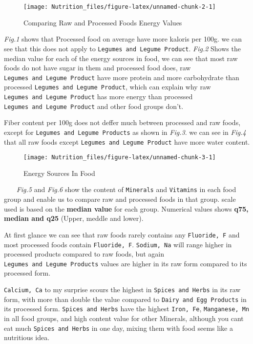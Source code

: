 \documentclass[]{article}
\begin{document}
\begin{figure}

{\centering \texttt{[image: Nutrition\_files/figure-latex/unnamed-chunk-2-1]} 

}

\caption{Comparing Raw and Processed Foods Energy Values}\label{fig:unnamed-chunk-2}
\end{figure}

\emph{Fig.1} shows that Processed food on average have more kaloris per
100g. we can see that this does not apply to
\texttt{Legumes\ and\ Legume\ Product}. \emph{Fig.2} Shows the median
value for each of the energy sources in food, we can see that most raw
foods do not have sugar in them and processed food does, raw
\texttt{Legumes\ and\ Legume\ Product} have more protein and more
carbohydrate than processed \texttt{Legumes\ and\ Legume\ Product},
which can explain why raw \texttt{Legumes\ and\ Legume\ Product} has
more energy than processed \texttt{Legumes\ and\ Legume\ Product} and
other food groups don't.

Fiber content per 100g does not deffer much between processed and raw
foods, except for \texttt{Legumes\ and\ Legume\ Products} as shown in
\emph{Fig.3}. we can see in \emph{Fig.4} that all raw foods except
\texttt{Legumes\ and\ Legume\ Product} have more water content.

\begin{figure}

{\centering \texttt{[image: Nutrition\_files/figure-latex/unnamed-chunk-3-1]} 

}

\caption{Energy Sources In Food}\label{fig:unnamed-chunk-3}
\end{figure}

~~~ \emph{Fig.5} and \emph{Fig.6} show the content of \texttt{Minerals}
and \texttt{Vitamins} in each food group and enable us to compare raw
and processed foods in that group. scale used is based on the
\textbf{median value} for each group. Numerical values shows
\textbf{q75, median and q25} (Upper, meddle and lower).

At first glance we can see that raw foods rarely contains any
\texttt{Fluoride,\ F} and most processed foods contain
\texttt{Fluoride,\ F}. \texttt{Sodium,\ Na} will range higher in
processed products compared to raw foods, but again
\texttt{Legumes\ and\ Legume\ Products} values are higher in its raw
form compared to its processed form.

\texttt{Calcium,\ Ca} to my surprise scours the highest in
\texttt{Spices\ and\ Herbs} in its raw form, with more than double the
value compared to \texttt{Dairy\ and\ Egg\ Products} in its processed
form. \texttt{Spices\ and\ Herbs} have the highest \texttt{Iron,\ Fe},
\texttt{Manganese,\ Mn} in all food groups, and high content value for
other Minerals, although you cant eat much \texttt{Spices\ and\ Herbs}
in one day, mixing them with food seems like a nutritious idea.
\end{document}
